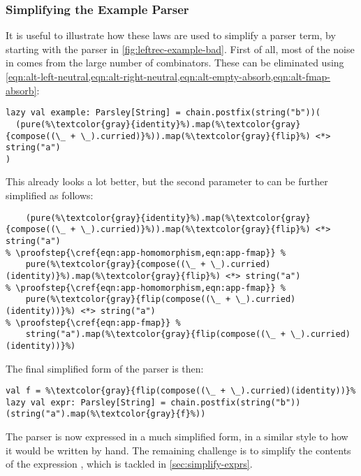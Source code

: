 \documentclass[../../../main.tex]{subfiles}
\begin{document}
\subsubsection{Simplifying the Example Parser}\label{sec:simplify-example}
It is useful to illustrate how these laws are used to simplify a parser term, by starting with the parser in \cref{fig:leftrec-example-bad}.
First of all, most of the noise in  comes from the large number of  combinators.
These can be eliminated using \cref{eqn:alt-left-neutral,eqn:alt-right-neutral,eqn:alt-empty-absorb,eqn:alt-fmap-absorb}:
\begin{verbatim}
lazy val example: Parsley[String] = chain.postfix(string("b"))(
  (pure(%\textcolor{gray}{identity}%).map(%\textcolor{gray}{compose((\_ + \_).curried)}%)).map(%\textcolor{gray}{flip}%) <*> string("a")
)
\end{verbatim}
%
This already looks a lot better, but the second parameter to  can be further simplified as follows:
\begin{verbatim}
    (pure(%\textcolor{gray}{identity}%).map(%\textcolor{gray}{compose((\_ + \_).curried)}%)).map(%\textcolor{gray}{flip}%) <*> string("a")
% \proofstep{\cref{eqn:app-homomorphism,eqn:app-fmap}} %
    pure(%\textcolor{gray}{compose((\_ + \_).curried)(identity)}%).map(%\textcolor{gray}{flip}%) <*> string("a")
% \proofstep{\cref{eqn:app-homomorphism,eqn:app-fmap}} %
    pure(%\textcolor{gray}{flip(compose((\_ + \_).curried)(identity))}%) <*> string("a")
% \proofstep{\cref{eqn:app-fmap}} %
    string("a").map(%\textcolor{gray}{flip(compose((\_ + \_).curried)(identity))}%)
\end{verbatim}
%
The final simplified form of the parser is then:
\begin{verbatim}
val f = %\textcolor{gray}{flip(compose((\_ + \_).curried)(identity))}%
lazy val expr: Parsley[String] = chain.postfix(string("b"))(string("a").map(%\textcolor{gray}{f}%))
\end{verbatim}
%
The parser is now expressed in a much simplified form, in a similar style to how it would be written by hand.
The remaining challenge is to simplify the contents of the expression , which is tackled in \cref{sec:simplify-exprs}.
\end{document}
